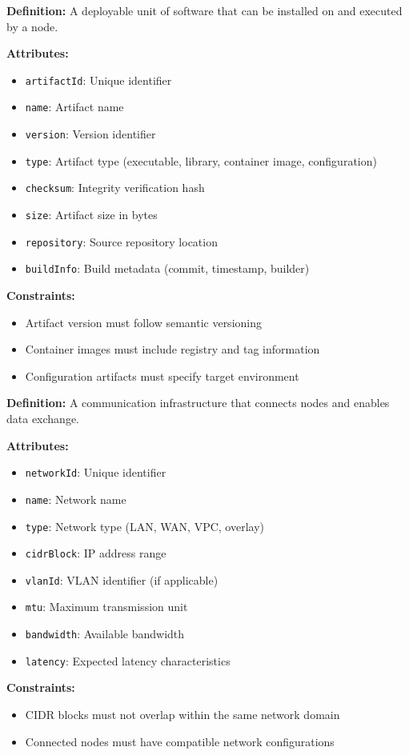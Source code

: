 \documentclass[11pt,letterpaper]{article}
\begin{document}
\begin{definitionbox}
\textbf{Definition:} A deployable unit of software that can be installed on and executed by a node.

\textbf{Attributes:}
\begin{itemize}[nosep]
    \item \texttt{artifactId}: Unique identifier
    \item \texttt{name}: Artifact name
    \item \texttt{version}: Version identifier
    \item \texttt{type}: Artifact type (executable, library, container image, configuration)
    \item \texttt{checksum}: Integrity verification hash
    \item \texttt{size}: Artifact size in bytes
    \item \texttt{repository}: Source repository location
    \item \texttt{buildInfo}: Build metadata (commit, timestamp, builder)
\end{itemize}

\textbf{Constraints:}
\begin{itemize}[nosep]
    \item Artifact version must follow semantic versioning
    \item Container images must include registry and tag information
    \item Configuration artifacts must specify target environment
\end{itemize}
\end{definitionbox}

\begin{definitionbox}
\textbf{Definition:} A communication infrastructure that connects nodes and enables data exchange.

\textbf{Attributes:}
\begin{itemize}[nosep]
    \item \texttt{networkId}: Unique identifier
    \item \texttt{name}: Network name
    \item \texttt{type}: Network type (LAN, WAN, VPC, overlay)
    \item \texttt{cidrBlock}: IP address range
    \item \texttt{vlanId}: VLAN identifier (if applicable)
    \item \texttt{mtu}: Maximum transmission unit
    \item \texttt{bandwidth}: Available bandwidth
    \item \texttt{latency}: Expected latency characteristics
\end{itemize}

\textbf{Constraints:}
\begin{itemize}[nosep]
    \item CIDR blocks must not overlap within the same network domain
    \item Connected nodes must have compatible network configurations
\end{itemize}
\end{definitionbox}
\end{document}
